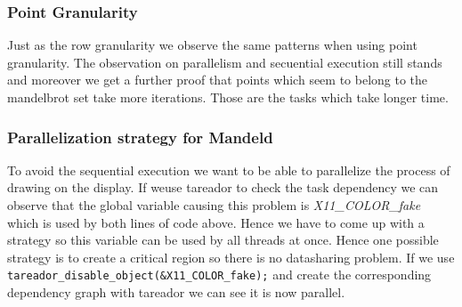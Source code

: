 \documentclass[11pt]{article}
\begin{document}
\subsubsection{Point Granularity}
\label{sec:orgbadb3cd}
Just as the row granularity we observe the same patterns when using point granularity. The observation on parallelism and secuential execution still stands and moreover we get a further proof that points which seem to belong to the mandelbrot set take more iterations. Those are the tasks which take longer time.


\subsubsection{Parallelization strategy for Mandeld}
\label{sec:org8b46160}
To avoid the sequential execution we want to be able to parallelize the process of drawing on the display. If weuse tareador to check the task dependency we can observe that the global variable causing this problem is \emph{X11\_COLOR\_fake} which is used by both lines of code above. Hence we have to come up with a strategy so this variable can be used by all threads at once. Hence one possible strategy is to create a critical region so there is no datasharing problem. If we use \texttt{tareador\_disable\_object(\&X11\_COLOR\_fake);} and create the corresponding dependency graph with tareador we can see it is now parallel.
\end{document}
